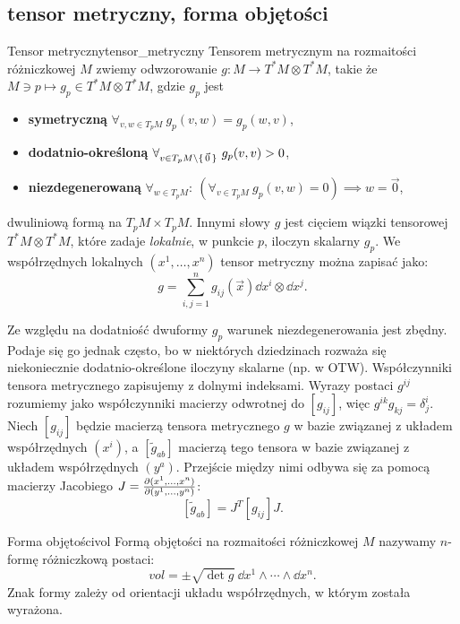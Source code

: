 \documentclass{article}
\begin{document}
\subsection{tensor metryczny, forma objętości}\label{sec:tensor_metryczny_vol}


\begin{dfn}{Tensor metryczny}{tensor_metryczny}
  Tensorem metrycznym na rozmaitości różniczkowej $M$ zwiemy odwzorowanie $g:M\to T^*M\otimes T^*M$, takie że $M\ni p\mapsto g_p\in T^*M\otimes T^*M$, gdzie $g_p$ jest 
  \begin{itemize}
    \item \textbf{symetryczną} $\forall_{v, w\in T_pM}\ g_p(v,w) = g_p(w,v)$,
    \item \textbf{dodatnio-określoną} $\forall_{v\in T_pM\setminus\set{\vec{0}}}\ g_p(v,v)>0$,
    \item \textbf{niezdegenerowaną} $\forall_{w\in T_pM}:\ (\forall_{v\in T_pM}\ g_p(v,w)=0)\implies w=\vec{0}$,
  \end{itemize}
  dwuliniową formą na $T_pM\times T_pM$. Innymi słowy $g$ jest cięciem wiązki tensorowej $T^*M\otimes T^*M$, które zadaje \textit{lokalnie}, w punkcie $p$, iloczyn skalarny $g_p$. We współrzędnych lokalnych $(x^1,\ldots,x^n)$ tensor metryczny można zapisać jako:
  \[
  g = \sum_{i,j=1}^{n}g_{ij}(\vec{x})\dd{x^i}\otimes\dd{x^j}.
  \]
\end{dfn}
Ze względu na dodatniość dwuformy $g_p$ warunek niezdegenerowania jest zbędny. Podaje się go jednak często, bo w niektórych dziedzinach rozważa się niekoniecznie dodatnio-określone iloczyny skalarne (np. w OTW).
Współczynniki tensora metrycznego zapisujemy z dolnymi indeksami. Wyrazy postaci $g^{ij}$ rozumiemy jako współczynniki macierzy odwrotnej do $[g_{ij}]$, więc $g^{ik}g_{kj}=\delta^i_j$. Niech \( [g_{ij}] \) będzie macierzą tensora metrycznego \( g \) w bazie związanej z układem współrzędnych \( (x^i) \), a \( [\widetilde{g}_{ab}] \) macierzą tego tensora w bazie związanej z układem współrzędnych \( (y^a) \). Przejście między nimi odbywa się za pomocą macierzy Jacobiego  $J = \pdv{(x^1,\ldots,x^n)}{(y^1,\ldots,y^n)}$:  
\[
[\widetilde{g}_{ab}] = J^T [g_{ij}] J.
\]

\begin{dfn}{Forma objętości}{vol}
  Formą objętości na rozmaitości różniczkowej $M$ nazywamy $n$-formę różniczkową postaci:
  \[
  vol = \pm\sqrt{\det g}\ \dd{x^1}\wedge\cdots\wedge\dd{x^n}.
  \]
  Znak formy zależy od orientacji układu współrzędnych, w którym została wyrażona.
\end{dfn}
\end{document}
